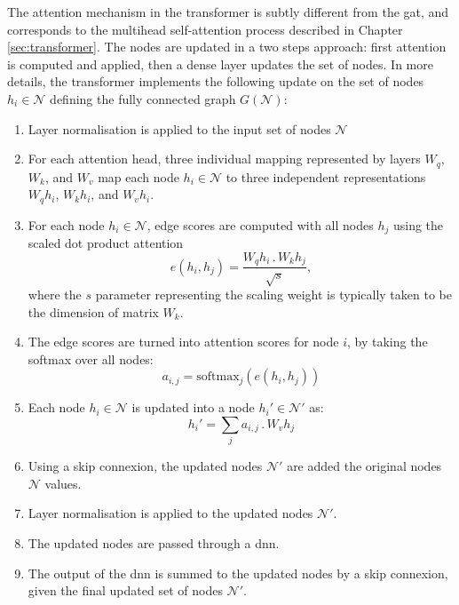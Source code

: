 The attention mechanism in the transformer is subtly different from the \gls{gat}, and corresponds to the multihead self-attention process described in Chapter \ref{sec:transformer}. The nodes are updated in a two steps approach: first attention is computed and applied, then a dense layer updates the set of nodes. In more details, the transformer implements the following update on the set of nodes $h_i \in \mathcal{N}$ defining the fully connected graph $G(\mathcal{N})$:
\begin{enumerate}
  \item Layer normalisation is applied to the input set of nodes $\mathcal{N}$
  \item For each attention head, three individual mapping represented by layers $W_q$, $W_k$, and $W_v$ map each node $h_i \in \mathcal{N}$ to three independent representations $W_qh_i$, $W_kh_i$, and $W_vh_i$.
  \item For each node $h_i \in \mathcal{N}$, edge scores are computed with all nodes $h_j$ using the scaled dot product attention \[e\left(h_i, h_j\right) = \frac{W_q h_i\, . \, W_k h_j}{\sqrt{s}},\] where the $s$ parameter representing the scaling weight is typically taken to be the dimension of matrix $W_k$. 
  \item The edge scores are turned into attention scores for node $i$, by taking the softmax over all nodes: \[a_{i, j} = \textrm{softmax}_j\left(e(h_i, h_j) \right) \]
  \item Each node $h_i \in \mathcal{N}$ is updated into a node $h_i' \in \mathcal{N}'$ as: \[h_i' = \sum_j a_{i, j} \,.\, W_v h_j\]
  \item Using a skip connexion, the updated nodes $\mathcal{N}'$ are added the original nodes $\mathcal{N}$ values. 
  \item Layer normalisation is applied to the updated nodes $\mathcal{N}'$.
  \item The updated nodes are passed through a \gls{dnn}.
  \item The output of the \gls{dnn} is summed to the updated nodes by a skip connexion, given the final updated set of nodes $\mathcal{N}'$.
\end{enumerate}

